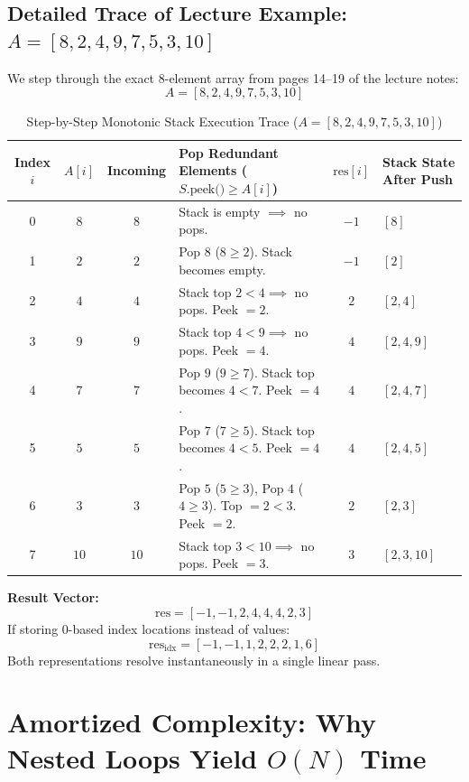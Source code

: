\documentclass[10pt,journal,compsoc,onecolumn]{IEEEtran}
\begin{document}
\subsection{Detailed Trace of Lecture Example: $A = [8, 2, 4, 9, 7, 5, 3, 10]$}

We step through the exact 8-element array from pages 14--19 of the lecture notes:
\[
A = [8, 2, 4, 9, 7, 5, 3, 10]
\]

\begin{table}[h]
\centering
\caption{Step-by-Step Monotonic Stack Execution Trace ($A = [8, 2, 4, 9, 7, 5, 3, 10]$)}
\label{tab:monotonic_trace}
\begin{tabular}{@{}cccp{6.0cm}cp{2.5cm}@{}}
\toprule
\textbf{Index $i$} & $A[i]$ & \textbf{Incoming} & \textbf{Pop Redundant Elements ($S\text{.peek()} \ge A[i]$)} & $\text{res}[i]$ & \textbf{Stack State After Push} \\ \midrule
0 & $8$ & $8$ & Stack is empty $\implies$ no pops. & $-1$ & $[8]$ \\
1 & $2$ & $2$ & Pop $8$ ($8 \ge 2$). Stack becomes empty. & $-1$ & $[2]$ \\
2 & $4$ & $4$ & Stack top $2 < 4 \implies$ no pops. Peek $= 2$. & $2$ & $[2, 4]$ \\
3 & $9$ & $9$ & Stack top $4 < 9 \implies$ no pops. Peek $= 4$. & $4$ & $[2, 4, 9]$ \\
4 & $7$ & $7$ & Pop $9$ ($9 \ge 7$). Stack top becomes $4 < 7$. Peek $= 4$. & $4$ & $[2, 4, 7]$ \\
5 & $5$ & $5$ & Pop $7$ ($7 \ge 5$). Stack top becomes $4 < 5$. Peek $= 4$. & $4$ & $[2, 4, 5]$ \\
6 & $3$ & $3$ & Pop $5$ ($5 \ge 3$), Pop $4$ ($4 \ge 3$). Top $= 2 < 3$. Peek $= 2$. & $2$ & $[2, 3]$ \\
7 & $10$ & $10$ & Stack top $3 < 10 \implies$ no pops. Peek $= 3$. & $3$ & $[2, 3, 10]$ \\ \bottomrule
\end{tabular}
\end{table}

\textbf{Result Vector:}
\[
\text{res} = [-1, -1, 2, 4, 4, 4, 2, 3]
\]
If storing 0-based index locations instead of values:
\[
\text{res}_{\text{idx}} = [-1, -1, 1, 2, 2, 2, 1, 6]
\]
Both representations resolve instantaneously in a single linear pass.

\section{Amortized Complexity: Why Nested Loops Yield $O(N)$ Time}
\label{sec:amortized}
\end{document}
